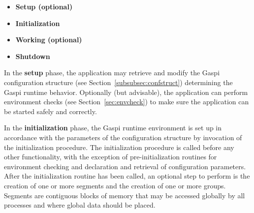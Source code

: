 \documentclass[a4paper]{article}
\newlength{\st}\setlength{\st}{0pt}
\newcommand{\GASPI}{{\sc Gaspi}}
\begin{document}
\begin{itemize}
\item \textbf{Setup (optional)}
\item \textbf{Initialization}
\item \textbf{Working (optional)}
\item \textbf{Shutdown}
\end{itemize}


In the \textbf{setup} phase, the application may retrieve and modify
the \GASPI{} configuration structure (see Section~\ref{subsubsec:confstruct})
determining the \GASPI{} runtime behavior. Optionally (but
advisable), the application can perform environment checks (see
Section~\ref{sec:envcheck}) to make sure the application can be
started safely and correctly.

In the \textbf{initialization} phase, the \GASPI{} runtime environment
is set up in accordance with the parameters of the configuration structure
by invocation of the initialization procedure.
The initialization procedure is called before any other functionality, with the
exception of pre-initialization routines for environment checking and
declaration and retrieval of configuration parameters.  After the
initialization routine has been called, an
optional step to perform is the creation of one or more segments and the creation of
one or more groups.
Segments are contiguous blocks of memory that may be accessed
globally by all processes and where global data should be placed.
\end{document}
